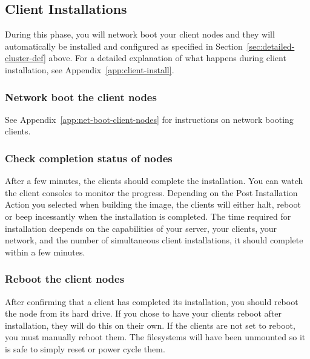 
\subsection{Client Installations}
\label{det:clientinstall}

During this phase, you will network boot your client nodes and they
will automatically be installed and configured as specified in
Section~\ref{sec:detailed-cluster-def} above. For a detailed
explanation of what happens during client installation, see
Appendix~\ref{app:client-install}.

\subsubsection{Network boot the client nodes}

See Appendix~\ref{app:net-boot-client-nodes} for instructions on
network booting clients.

\subsubsection{Check completion status of nodes}
\label{det:clientfinish}

After a few minutes, the clients should complete the installation.
You can watch the client consoles to monitor the progress. Depending
on the Post Installation Action you selected when building the image,
the clients will either halt, reboot or beep incessantly when the 
installation is completed. 
The time required for installation deepends on the capabilities of
your server, your clients, your network, and the number of simultaneous 
client installations, it should complete within a few minutes.
  
\subsubsection{Reboot the client nodes}

After confirming that a client has completed its installation, you
should reboot the node from its hard drive. If you chose to have your
clients reboot after installation, they will do this on their
own. If the clients are not set to reboot, you must manually
reboot them. The filesystems will have been unmounted so it is safe
to simply reset or power cycle them.

